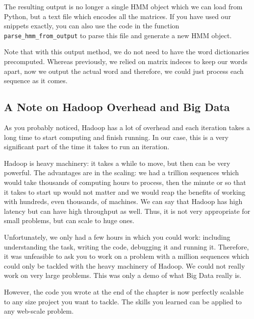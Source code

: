 The resulting output is no longer a single HMM object which we can load from
Python, but a text file which encodes all the matrices. If you have used our
snippets exactly, you can also use the code in the function
\verb+parse_hmm_from_output+ to parse this file and generate a new HMM object.

Note that with this output method, we do not need to have the word dictionaries
precomputed. Whereas previously, we relied on matrix indeces to keep our words
apart, now we output the actual word and therefore, we could just process each
sequence as it comes.

\subsection{A Note on Hadoop Overhead and Big Data}

As you probably noticed, Hadoop has a lot of overhead and each iteration takes
a long time to start computing and finish running. In our case, this is a very
significant part of the time it takes to run an iteration.

Hadoop is heavy machinery: it takes a while to move, but then can be very
powerful. The advantages are in the scaling: we had a trillion sequences which
would take thousands of computing hours to process, then the minute or so that
it takes to start up would not matter and we would reap the benefits of working
with hundreds, even thousands, of machines. We can say that Hadoop has high
latency but can have high throughput as well. Thus, it is not very appropriate
for small problems, but can scale to huge ones.

Unfortunately, we only had a few hours in which you could work: including
understanding the task, writing the code, debugging it and running it.
Therefore, it was unfeasible to ask you to work on a problem with a million
sequences which could only be tackled with the heavy machinery of Hadoop.
We could not really work on very large problems. This was only a demo of what
Big Data really is.

However, the code you wrote at the end of the chapter is now perfectly scalable
to any size project you want to tackle. The skills you learned can be applied
to any web-scale problem.

